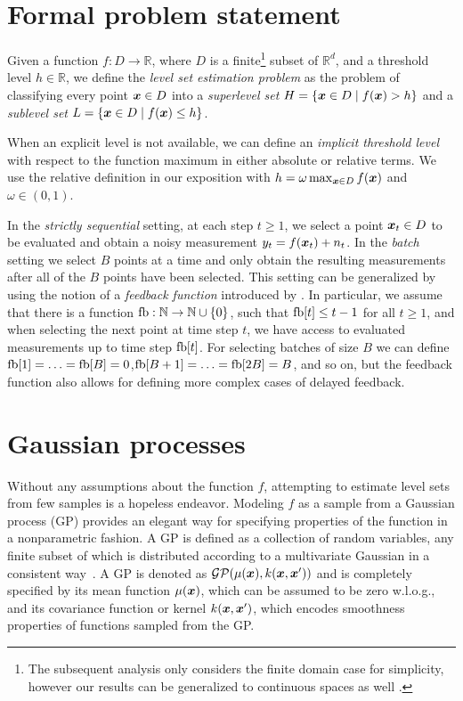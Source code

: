 \section{Formal problem statement} \label{sect:prelim}

Given a function ${f : D \to \mathbb{R}}$, where $D$ is a
finite\footnote{The subsequent analysis only considers the finite domain case
for simplicity, however our results can be generalized to continuous spaces
as well \citep[cf.][]{srinivas10}.}
subset of $\mathbb{R}^d$, and a threshold level ${h \in \mathbb{R}}$,
we define the \emph{level set estimation problem} as the problem of classifying
every point $\bm{x} \in D$ into a \emph{superlevel set}
${H = \{\bm{x} \in D \mid f(\bm{x}) > h\}}$ and a \emph{sublevel set}
${L = \{\bm{x} \in D \mid f(\bm{x}) \leq h\}}$.

When an explicit level is not available, we can define an
\emph{implicit threshold level}
with respect to the function maximum in either absolute or relative terms.
We use the relative definition in our exposition with
${h = \omega \max_{\bm{x}\in D} f(\bm{x})}$
and $\omega \in (0, 1)$.

In the \emph{strictly sequential} setting,
at each step $t \geq 1$, we select a point $\bm{x}_t \in D$ to be evaluated and
obtain a noisy measurement $y_t = f(\bm{x}_t) + n_t$.
In the \emph{batch} setting we select $B$ points at a time and only obtain
the resulting measurements after all of the $B$ points have been selected.
This setting can be generalized by using the notion of a
\emph{feedback function} introduced by \citet{desautels12}.
In particular, we assume that there is a function
${\mathop{\mathrm{fb}} : \mathbb{N} \to \mathbb{N}\cup\{0\}}$, such that
$\mathop{\mathrm{fb}}[t] \leq t-1$ for all $t \geq 1$, and when selecting the next point
at time step $t$, we have access to evaluated measurements up to
time step $\mathop{\mathrm{fb}}[t]$. For selecting batches of size $B$ we can define
$\mathop{\mathrm{fb}}[1] = \ldots = \mathop{\mathrm{fb}}[B] = 0$,\enskip$\mathop{\mathrm{fb}}[B+1] = \ldots = \mathop{\mathrm{fb}}[2B] = B$,
and so on,
but the feedback function also allows for defining more complex cases
of delayed feedback.

\section{Gaussian processes}
 Without any assumptions about the function $f$, attempting to estimate level sets from few samples is a hopeless endeavor.
Modeling $f$ as a sample from a Gaussian process
(GP) provides an elegant way for specifying properties of the function in a
nonparametric fashion. A GP is defined as a collection of random variables,
any finite subset of which is distributed according to a
multivariate Gaussian in a consistent way~\cite{rasmussen06}. A GP is
denoted as $\mathcal{GP}(\mu(\bm{x}), k(\bm{x}, \bm{x}'))$ and is
completely specified by its mean function $\mu(\bm{x})$, which can be
assumed to be zero w.l.o.g., and its covariance function or kernel
$k(\bm{x}, \bm{x}')$, which encodes smoothness properties of functions sampled
from the GP.

